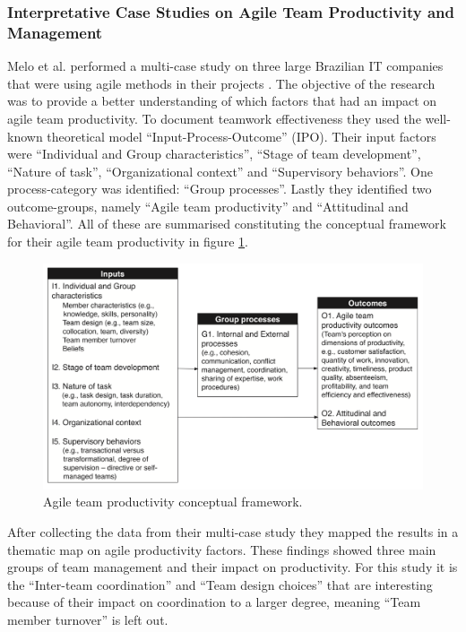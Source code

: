 \subsubsection{Interpretative Case Studies on Agile Team Productivity and Management}

Melo et al. performed a multi-case study on three large Brazilian IT companies that were using agile methods in their projects \cite{Melo2013}. The objective of the research was to provide a better understanding of which factors that had an impact on agile team productivity. To document teamwork effectiveness they used the well-known theoretical model ``Input-Process-Outcome'' (IPO). Their input factors were ``Individual and Group characteristics'', ``Stage of team development'', ``Nature of task'', ``Organizational context'' and ``Supervisory behaviors''. One process-category was identified: ``Group processes''. Lastly they identified two outcome-groups, namely ``Agile team productivity'' and ``Attitudinal and Behavioral''. All of these are summarised constituting the conceptual framework for their agile team productivity in figure \ref{atpcf}.

\begin{figure}[ht!]
\centering
\includegraphics[width=150mm]{images/IPO.png}
\caption{Agile team productivity conceptual framework.}
\label{atpcf}
\end{figure}

After collecting the data from their multi-case study they mapped the results in a thematic map on agile productivity factors. These findings showed three main groups of team management and their impact on productivity. For this study it is the ``Inter-team coordination'' and ``Team design choices'' that are interesting because of their impact on coordination to a larger degree, meaning ``Team member turnover'' is left out. 

